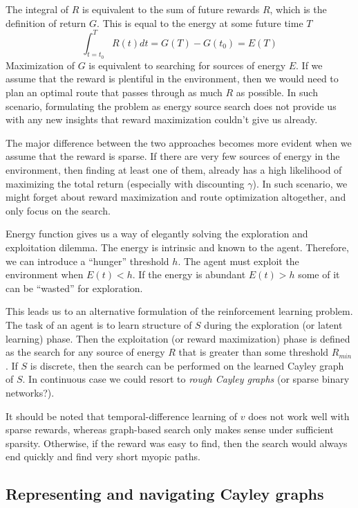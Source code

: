 \documentclass[12pt]{article}
\begin{document}
The integral of $R$ is equivalent to the sum of future rewards $R$, which is the definition of return $G$. This is equal to the energy at some future time $T$
\[
\int_{t=t_0}^{T} R(t) dt = G(T) - G(t_0) = E(T)
\]
Maximization of $G$ is equivalent to searching for sources of energy $E$. If we assume that the reward is plentiful in the environment, then we would need to plan an optimal route that passes through as much $R$ as possible. In such scenario, formulating the problem as energy source search does not provide us with any new insights that reward maximization couldn't give us already. 

The major difference between the two approaches becomes more evident when we assume that the reward is sparse. If there are very few sources of energy in the environment, then finding at least one of them, already has a high likelihood of maximizing the total return (especially with discounting $\gamma$). In such scenario, we might forget about reward maximization and route optimization altogether, and only focus on the search. 

Energy function gives us a way of elegantly solving the exploration and exploitation dilemma. The energy is intrinsic and known to the agent. Therefore, we can introduce a ``hunger'' threshold $h$. The agent must exploit the environment when $E(t) < h$. If the energy is abundant $E(t)>h$ some of it can be ``wasted'' for exploration. 

This leads us to an alternative formulation of the reinforcement learning problem.
The task of an agent is to learn structure of $S$ during the exploration (or latent learning) phase. Then the exploitation (or reward maximization) phase is defined as the search for any source of energy $R$ that is greater than some threshold $R_{min}$. If $S$ is discrete, then the search can be performed on the learned Cayley graph of $S$. In continuous case we could resort to \textit{rough Cayley graphs} (or sparse binary networks?). 

It should be noted that temporal-difference learning of $v$ does not work well with sparse rewards, whereas graph-based search only makes sense under sufficient sparsity. Otherwise, if the reward was easy to find, then the search would always end quickly and find very short myopic paths.



\subsection{Representing and navigating Cayley graphs}
 
\end{document}
